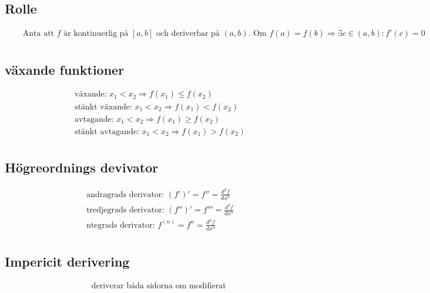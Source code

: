 \documentclass{article}
\begin{document}
\subsection{Rolle} 
\begin{align*}
  &\quad  \text{Anta att $f$ är kontinuerlig på $[a,b]$ och deriverbar på $(a,b)$. Om } f(a)=f(b) \Rightarrow
  \exists c \in (a,b):f'(c)=0 \\
\end{align*}


\newpage


\subsection{växande funktioner}
\begin{align*}
  &\quad  \text{växande: }          x_1<x_2 \Rightarrow f(x_1) \leq f(x_2) \\
  &\quad  \text{stänkt växande: }   x_1<x_2 \Rightarrow f(x_1) < f(x_2)    \\
  &\quad  \text{avtagande: }        x_1<x_2 \Rightarrow f(x_1) \geq f(x_2) \\
  &\quad  \text{stänkt avtagande: } x_1<x_2 \Rightarrow f(x_1) > f(x_2)    \\
\end{align*}


\subsection{Högreordnings devivator}
\begin{align*}
  &\quad  \text{andragrads derivator: }  (f')' = f''  =\frac{d^2f}{dx^2} \\
  &\quad  \text{tredjegrads derivator: } (f'')'= f''' =\frac{d^3f}{dx^3} \\
  &\quad  \text{ntegrads derivator: }    f^{(n)}= f^{n}=\frac{d^{n}f}{dx^{n}} \\
\end{align*}


\subsection{Impericit derivering}
\begin{align*}
  &\quad  \text{deriverar båda sidorna om modifierat } \\
\end{align*}
\end{document}
